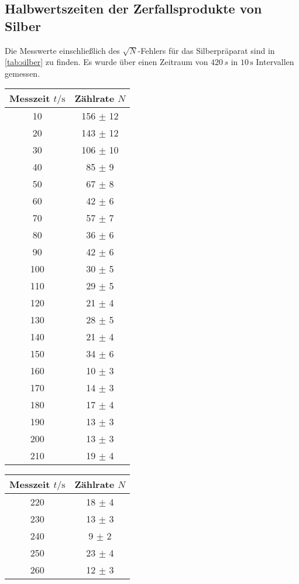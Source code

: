 \subsection{Halbwertszeiten der Zerfallsprodukte von Silber}
\label{sec:Silber}
Die Messwerte einschließlich des $\sqrt{N}$-Fehlers für das Silberpräparat sind in \autoref{tab:silber} zu finden.
Es wurde über einen Zeitraum von $420\,\unit{s}$ in $10\,\unit{\second}$ Intervallen gemessen.
\begin{table}
  \centering
  \begin{tabular}{c c}
    \toprule
    Messzeit $t/\unit{\second}$ & Zählrate $N$ \\
    \midrule
     10 & 156 $\pm$ 12 \\
     20 & 143 $\pm$ 12 \\
     30 & 106 $\pm$ 10 \\
     40 &  85 $\pm$  9 \\
     50 &  67 $\pm$  8 \\
     60 &  42 $\pm$  6 \\
     70 &  57 $\pm$  7 \\
     80 &  36 $\pm$  6 \\
     90 &  42 $\pm$  6 \\
    100 &  30 $\pm$  5 \\
    110 &  29 $\pm$  5 \\
    120 &  21 $\pm$  4 \\
    130 &  28 $\pm$  5 \\
    140 &  21 $\pm$  4 \\
    150 &  34 $\pm$  6 \\
    160 &  10 $\pm$  3 \\
    170 &  14 $\pm$  3 \\
    180 &  17 $\pm$  4 \\
    190 &  13 $\pm$  3 \\
    200 &  13 $\pm$  3 \\
    210 &  19 $\pm$  4 \\
    \bottomrule
  \end{tabular}
  \begin{tabular}{c c}
    \toprule
    Messzeit $t/\unit{\second}$ & Zählrate $N$ \\
    \midrule
    220 & 18 $\pm$ 4 \\
    230 & 13 $\pm$ 3 \\
    240 &  9 $\pm$ 2 \\
    250 & 23 $\pm$ 4 \\
    260 & 12 $\pm$ 3 \\

\end{tabular}
\end{table}
